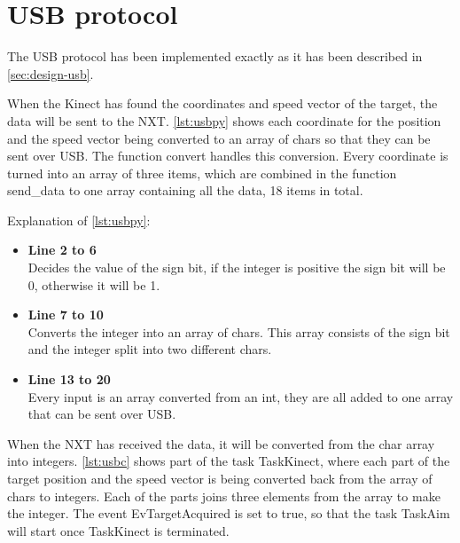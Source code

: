 \section{USB protocol}
The USB protocol has been implemented exactly as it has been described in \autoref{sec:design-usb}.

When the Kinect has found the coordinates and speed vector of the target, the data will be sent to the NXT. \autoref{lst:usbpy} shows each coordinate for the position and the speed vector being converted to an array of chars so that they can be sent over USB. The function convert handles this conversion. Every coordinate is turned into an array of three items, which are combined in the function send\_data to one array containing all the data, 18 items in total. 



Explanation of \autoref{lst:usbpy}:

\begin{itemize}
\item \textbf{Line 2 to 6}\\
Decides the value of the sign bit, if the integer is positive the sign bit will be 0, otherwise it will be 1.
\item \textbf{Line 7 to 10}\\
Converts the integer into an array of chars. This array consists of the sign bit and the integer split into two different chars.
\item \textbf{Line 13 to 20}\\
Every input is an array converted from an int, they are all added to one array that can be sent over USB.
\end{itemize}

When the NXT has received the data, it will be converted from the char array into integers. \autoref{lst:usbc} shows part of the task TaskKinect, where each part of the target position and the speed vector is being converted back from the array of chars to integers. Each of the parts joins three elements from the array to make the integer. 
The event EvTargetAcquired is set to true, so that the task TaskAim will start once TaskKinect is terminated.

